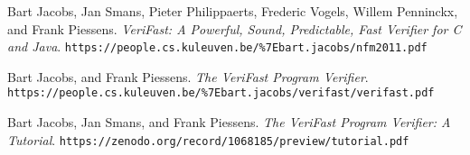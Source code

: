\begin{thebibliography}{9}
Bart Jacobs, Jan Smans, Pieter Philippaerts, Frederic Vogels, Willem Penninckx, and Frank Piessens.
\textit{VeriFast: A Powerful, Sound, Predictable, Fast Verifier for C and Java}.
\texttt{https://people.cs.kuleuven.be/\%7Ebart.jacobs/nfm2011.pdf}

Bart Jacobs, and Frank Piessens.
\textit{The VeriFast Program Verifier}.
\texttt{https://people.cs.kuleuven.be/\%7Ebart.jacobs/verifast/verifast.pdf}

Bart Jacobs, Jan Smans, and Frank Piessens.
\textit{The VeriFast Program Verifier: A Tutorial}.
\texttt{https://zenodo.org/record/1068185/preview/tutorial.pdf}
\end{thebibliography}
